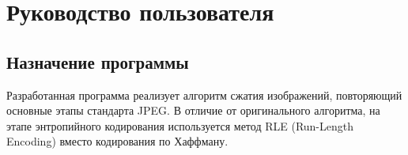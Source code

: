 \section{Руководство пользователя}

\subsection{Назначение программы}

Разработанная программа реализует алгоритм сжатия изображений, повторяющий основные этапы стандарта JPEG. 
В отличие от оригинального алгоритма, на этапе энтропийного кодирования используется метод RLE (Run-Length Encoding) 
вместо кодирования по Хаффману. 






